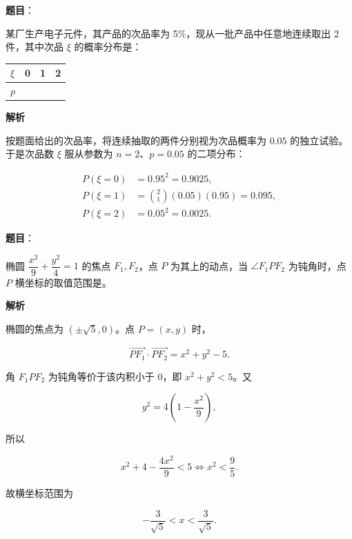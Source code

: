 \begin{answer}

\textbf{题目}：

某厂生产电子元件，其产品的次品率为 5\%，现从一批产品中任意地连续取出 2 件，其中次品 $\xi$ 的概率分布是：

\begin{center}
\begin{tabular}{lrrr}
\toprule
$\xi$ & 0 & 1 & 2 \\
\midrule
$p$ & \gkblank{} & \gkblank{} & \gkblank{} \\
\bottomrule
\end{tabular}
\end{center}

\textbf{解析}

按题面给出的次品率，将连续抽取的两件分别视为次品概率为 $0.05$ 的独立试验。于是次品数 $\xi$ 服从参数为 $n=2$、$p=0.05$ 的二项分布：

\nopagebreak[4]
\[
\begin{aligned}
P(\xi=0)&=0.95^2=0.9025,\\
P(\xi=1)&=\binom21(0.05)(0.95)=0.095,\\
P(\xi=2)&=0.05^2=0.0025.
\end{aligned}
\]


\end{answer}
\begin{answer}

\textbf{题目}：

椭圆 $\dfrac{x^2}{9}+\dfrac{y^2}{4}=1$ 的焦点 $F_1,F_2$，点 $P$ 为其上的动点，当 $\angle F_1PF_2$ 为钝角时，点 $P$ 横坐标的取值范围是\gkblank{}。

\textbf{解析}

椭圆的焦点为 $(\pm\sqrt5,0)$。点 $P=(x,y)$ 时，

\nopagebreak[4]
\[
\overrightarrow{PF_1}\cdot\overrightarrow{PF_2}=x^2+y^2-5.
\]

角 $F_1PF_2$ 为钝角等价于该内积小于 $0$，即 $x^2+y^2<5$。又

\nopagebreak[4]
\[
y^2=4\left(1-\frac{x^2}{9}\right),
\]

所以

\nopagebreak[4]
\[
x^2+4-\frac{4x^2}{9}<5
\Longleftrightarrow x^2<\frac95.
\]

故横坐标范围为

\nopagebreak[4]
\[
-\frac3{\sqrt5}<x<\frac3{\sqrt5}.
\]


\end{answer}
